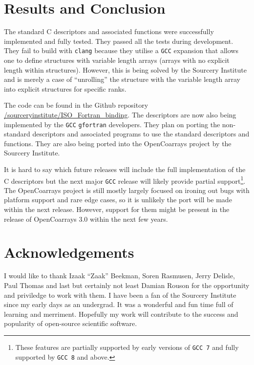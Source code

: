 \section{Results and Conclusion}

The standard C descriptors and associated functions were successfully implemented and fully tested. They passed all the tests during development. They fail to build with \texttt{clang} because they utilise a \texttt{GCC} expansion that allows one to define structures with variable length arrays (arrays with no explicit length within structures). However, this is being solved by the Sourcery Institute \cite{sourcery} and is merely a case of ``unrolling'' the structure with the variable length array into explicit structures for specific ranks.

The code can be found in the Github repository \newline{}\href{https://github.com/sourceryinstitute/ISO_Fortran_binding}{/sourceryinstitute/ISO\_Fortran\_binding}. The descriptors are now also being implemented by the \texttt{GCC} \texttt{gfortran} developers. They plan on porting the non-standard descriptors and associated programs to use the standard descriptors and functions. They are also being ported into the OpenCoarrays project \cite{ocafp} by the Sourcery Institute.

It is hard to say which future releases will include the full implementation of the C descriptors but the next major \texttt{GCC} release will likely provide partial support\footnote{These features are partially supported by early versions of \texttt{GCC 7} and fully supported by \texttt{GCC 8} and above.}. The OpenCoarrays project is still mostly largely focused on ironing out bugs with platform support and rare edge cases, so it is unlikely the port will be made within the next release. However, support for them might be present in the release of OpenCoarrays 3.0 within the next few years.

\section{Acknowledgements}

I would like to thank Izaak ``Zaak'' Beekman, Soren Rasmusen, Jerry Delisle, Paul Thomas and last but certainly not least Damian Rouson for the opportunity and priviledge to work with them. I have been a fan of the Sourcery Institute since my early days as an undergrad. It was a wonderful and fun time full of learning and merriment. Hopefully my work will contribute to the success and popularity of open-source scientific software.